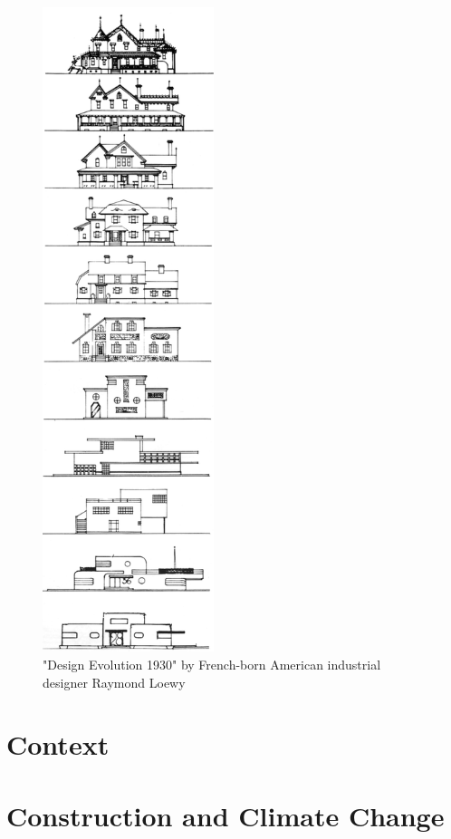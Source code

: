 \documentclass{article}
\begin{document}
\begin{minipage}{0.2\textwidth}
    \begin{figure}[H]
    \includegraphics[width=50mm]{./figures/loewy_architecture.png}
    \caption{
        "Design Evolution 1930" by French-born American industrial designer Raymond Loewy \cite{loewy_industrial_1979}
    }
    \label{fig:loewy}
    \end{figure}
\end{minipage}

\clearpage
\section{Context}

\section{Construction and Climate Change}
\end{document}
